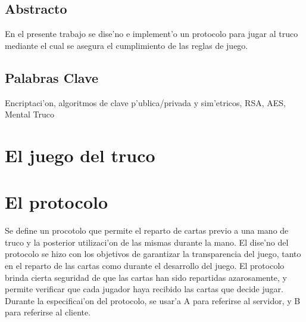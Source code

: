 \documentclass[spanish, a4paper, 11pt]{article}
\begin{document}
\maketitle

\subsection*{Abstracto}
En el presente trabajo se dise'no e implement'o un protocolo para jugar al truco mediante el cual se asegura el cumplimiento de las reglas de juego.


\subsection*{Palabras Clave}
Encriptaci'on, algoritmos de clave p'ublica/privada y sim'etricos, RSA, AES, Mental Truco


\clearpage
\tableofcontents

\clearpage


\clearpage
\section{El juego del truco}





\clearpage
\section{El protocolo}
Se define un procotolo que permite el reparto de cartas previo a una mano de truco y la posterior utilizaci'on de las mismas durante la mano. El dise'no del protocolo se hizo con los objetivos de garantizar la transparencia del juego, tanto en el reparto de las cartas como durante el desarrollo del juego.
El protocolo brinda cierta seguridad de que las cartas han sido repartidas azarosamente, y permite verificar que cada jugador haya recibido las cartas que decide jugar.
Durante la especificai'on del protocolo, se usar'a A para referirse al servidor, y B para referirse al cliente.


\end{document}
